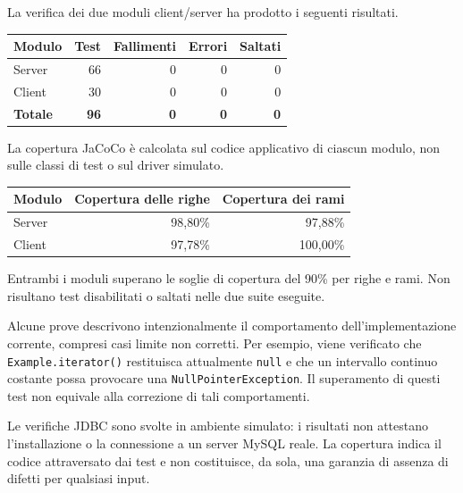 \documentclass[11pt,a4paper]{article}
\begin{document}
La verifica dei due moduli client/server ha prodotto i seguenti risultati.

\begin{center}
\begin{tabular}{lrrrr}
\toprule
\textbf{Modulo} & \textbf{Test} & \textbf{Fallimenti} & \textbf{Errori} & \textbf{Saltati} \\
\midrule
Server & 66 & 0 & 0 & 0 \\
Client & 30 & 0 & 0 & 0 \\
\midrule
\textbf{Totale} & \textbf{96} & \textbf{0} & \textbf{0} & \textbf{0} \\
\bottomrule
\end{tabular}
\end{center}

La copertura JaCoCo è calcolata sul codice applicativo di ciascun modulo, non
sulle classi di test o sul driver simulato.

\begin{center}
\begin{tabular}{lrr}
\toprule
\textbf{Modulo} & \textbf{Copertura delle righe} & \textbf{Copertura dei rami} \\
\midrule
Server & 98,80\% & 97,88\% \\
Client & 97,78\% & 100,00\% \\
\bottomrule
\end{tabular}
\end{center}

Entrambi i moduli superano le soglie di copertura del 90\% per righe e rami.
Non risultano test disabilitati o saltati nelle due suite eseguite.

Alcune prove descrivono intenzionalmente il comportamento dell'implementazione
corrente, compresi casi limite non corretti. Per esempio, viene verificato che
\texttt{Example.iterator()} restituisca attualmente \texttt{null} e che un
intervallo continuo costante possa provocare una \texttt{NullPointerException}.
Il superamento di questi test non equivale alla correzione di tali comportamenti.

Le verifiche JDBC sono svolte in ambiente simulato: i risultati non attestano
l'installazione o la connessione a un server MySQL reale. La copertura indica il
codice attraversato dai test e non costituisce, da sola, una garanzia di assenza
di difetti per qualsiasi input.


\end{document}
